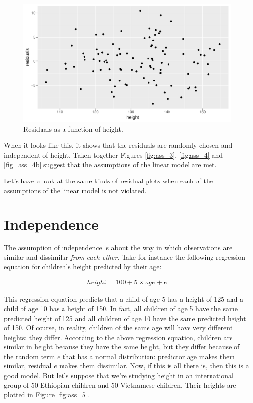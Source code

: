 \documentclass[]{report}\usepackage[]{graphicx}\usepackage[]{color}
\makeatletter
\def\maxwidth{ %
  \ifdim\Gin@nat@width>\linewidth
    \linewidth
  \else
    \Gin@nat@width
  \fi
}
\newenvironment{knitrout}{}{} %
\makeatother
\begin{document}
\begin{knitrout}
\color{fgcolor}\begin{figure}

{\centering \includegraphics[width=\maxwidth]{figure/ass_4b-1} 

}

\caption[Residuals as a function of height]{Residuals as a function of height.}\label{fig:ass_4b}
\end{figure}


\end{knitrout}


When it looks like this, it shows that the residuals are randomly chosen and independent of height. Taken together Figures \ref{fig:ass_3}, \ref{fig:ass_4} and \ref{fig_ass_4b} suggest that the assumptions of the linear model are met. 

Let's have a look at the same kinds of residual plots when each of the assumptions of the linear model is not violated.

\section{Independence}
The assumption of independence is about the way in which observations are similar and dissimilar \textit{from each other}. Take for instance the following regression equation for children's height predicted by their age:

\begin{eqnarray}
height = 100 + 5 \times age + e
\end{eqnarray}

This regression equation predicts that a child of age 5 has a height of 125 and a child of age 10 has a height of 150. In fact, all children of age 5 have the same predicted height of 125 and all children of age 10 have the same predicted height of 150. Of course, in reality, children of the same age will have very different heights: they differ. According to the above regression equation, children are similar in height because they have the same height, but they differ because of the random term $e$ that has a normal distribution: predictor age makes them similar, residual $e$ makes them dissimilar. Now, if this is all there is, then this is a good model. But let's suppose that we're studying height in an international group of 50 Ethiopian children and 50 Vietnamese children. Their heights are plotted in Figure \ref{fig:ass_5}.
\end{document}
